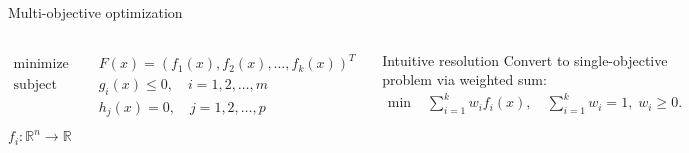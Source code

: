 \documentclass[aspectratio=169,xcolor=dvipsnames]{beamer}
\begin{document}


\begin{frame}{Multi-objective optimization}
    \begin{columns}[c]
        \begin{equation*}
            \begin{aligned}
                \text{minimize }   & \quad F(x) = (f_1(x), f_2(x), \dots, f_k(x))^T \\
                \text{subject to } & \quad g_i(x) \leq 0, \quad i = 1, 2, \dots, m  \\
                                   & \quad h_j(x) = 0, \quad j = 1, 2, \dots, p     \\
            \end{aligned}
        \end{equation*}
        $f_i: \mathbb{R}^n \rightarrow \mathbb{R}$

        \vspace{1em}
        \begin{block}{Intuitive resolution}
            Convert to single-objective problem via weighted sum:
            \vspace{-.85em}
            \begin{align*}
                \text{min } & \sum_{i=1}^k w_i f_i(x), \quad \sum_{i=1}^k w_i = 1, \; w_i \geq 0.
            \end{align*}
        \end{block}



        \begin{figure}
            \centering
            \includegraphics[width=1\linewidth]{imgs/objective-space.pdf}
            \caption{Different spaces in multi-objective optimization.}
        \end{figure}


\end{columns}
\end{frame}
\end{document}
